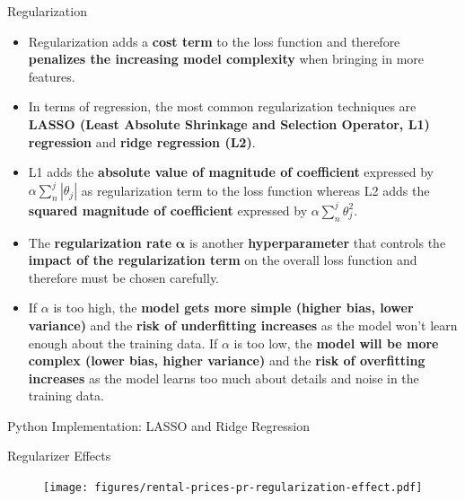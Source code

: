\documentclass[document.tex]{subfiles}
\begin{document}
    \begin{frame}{Regularization}
        \begin{itemize}
            \item Regularization adds a \textbf{cost term} to the loss function and therefore \textbf{penalizes the increasing model complexity} when bringing in more features. 
            \item In terms of regression, the most common regularization techniques are \textbf{LASSO (Least Absolute Shrinkage and Selection Operator, L1) regression} and \textbf{ridge regression (L2)}. 
            \item L1 adds the \textbf{absolute value of magnitude of coefficient} expressed by $\alpha \sum_{n}^{j} |\theta_j|$ as regularization term to the loss function whereas L2 adds the \textbf{squared magnitude of coefficient} expressed by $\alpha \sum_{n}^{j} \theta_j^2$.
            \item The \textbf{regularization rate} $\pmb{\alpha}$ is another \textbf{hyperparameter} that controls the \textbf{impact of the regularization term} on the overall loss function and therefore must be chosen carefully.
            \item If $\alpha$ is too high, the \textbf{model gets more simple (higher bias, lower variance)} and the \textbf{risk of underfitting increases} as the model won't learn enough about the training data.  If $\alpha$ is too low, the \textbf{model will be more complex (lower bias, higher variance)} and the \textbf{risk of overfitting increases} as the model learns too much about details and noise in the training data.
        \end{itemize}
    \end{frame}

    \begin{frame}{Python Implementation: LASSO and Ridge Regression}
        
    \end{frame}

    \begin{frame}{Regularizer Effects}
        \begin{figure}
            \label{fig:rental-prices-pr-regularization-effect}
            \texttt{[image: figures/rental-prices-pr-regularization-effect.pdf]}
        \end{figure}
    \end{frame}
    
\end{document}
